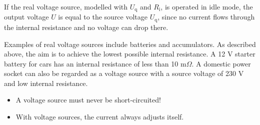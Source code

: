 {    If the real voltage source, modelled with $U_\mathrm{q}$ and $R_{\mathrm{i}}$, is operated in idle mode, the output voltage $U$ is equal to the source voltage $U_\mathrm{q}$, 
    since no current flows through the internal resistance and no voltage can drop there.

    
    Examples of real voltage sources include batteries and accumulators. As described above, the aim is to achieve the lowest possible internal resistance.
    A 12 V starter battery for cars has an internal resistance of less than 10 m$\Omega$. 
    A domestic power socket can also be regarded as a voltage source with a source voltage of 230 V and low internal resistance.
}

\begin{frame}
    
    \begin {Key point}{}
    \begin{itemize}
        \item A voltage source must never be short-circuited!
        \item With voltage sources, the current always adjusts itself.
    \end{itemize}
    \end {Key point}
    
    
\end{frame}

